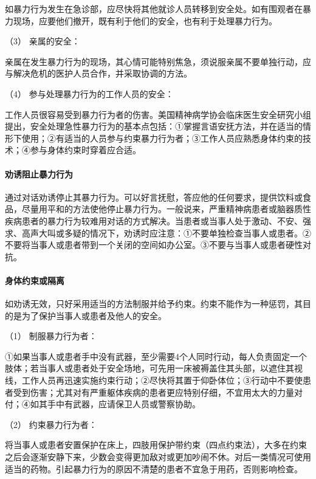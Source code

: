 如暴力行为发生在急诊部，应尽快将其他就诊人员转移到安全处。如有围观者在暴力现场，应要他们撤开，既有利于他们的安全，也有利于处理暴力行为。

\hypertarget{text00054.htmlux5cux23CHP1-18-12-3-1-3}{}
（3） 亲属的安全：

亲属在发生暴力行为的现场，其心情可能特别焦急，须说服亲属不要单独行动，应与解决危机的医护人员合作，并采取协调的方法。

\hypertarget{text00054.htmlux5cux23CHP1-18-12-3-1-4}{}
（4） 参与处理暴力行为的工作人员的安全：

工作人员很容易受到暴力行为者的伤害。美国精神病学协会临床医生安全研究小组提出，安全处理急性暴力行为的基本点包括：①掌握言语安抚方法，并在适当的情形下使用；②有适当的人员参与约束暴力行为者；③工作人员应熟悉身体约束的技术；④参与身体约束时穿着应合适。

\paragraph{劝诱阻止暴力行为}

通过对话劝诱停止其暴力行为。可以好言抚慰，答应他的任何要求，提供饮料或食品，尽量用平和的方法使他停止暴力行为。一般说来，严重精神病患者或脑器质性疾病患者的暴力行为较难用对话的方式解决。当患者或当事人处于激动、不安、强求、高声大叫或多疑的情况下，劝诱时应注意：①不要单独检查当事人或患者。②不要将当事人或患者带到一个关闭的空间如办公室。③不要与当事人或患者硬性对抗。

\paragraph{身体约束或隔离}

如劝诱无效，只好采用适当的方法制服并给予约束。约束不能作为一种惩罚，其目的是为了保护当事人或患者及他人的安全。

\hypertarget{text00054.htmlux5cux23CHP1-18-12-3-3-1}{}
（1） 制服暴力行为者：

①如果当事人或患者手中没有武器，至少需要4个人同时行动，每人负责固定一个肢体；若当事人或患者处于安全场地，可先用一床被褥盖住其头部，以遮住其视线，工作人员再迅速实施约束行动；②尽快将其置于仰卧体位；③行动中不要使患者受到伤害；尤其对有严重躯体疾病的患者更应特别仔细，不宜用太大的力量对付；④如其手中有武器，应请保卫人员或警察协助。

\hypertarget{text00054.htmlux5cux23CHP1-18-12-3-3-2}{}
（2） 约束暴力行为者：

将当事人或患者安置保护在床上，四肢用保护带约束（四点约束法），大多在约束之后会逐渐安静下来，少数会变得更加敌对或更加吵闹不休。对后一类情况可使用适当的药物。引起暴力行为的原因不清楚的患者不宜急于用药，否则影响检查。

